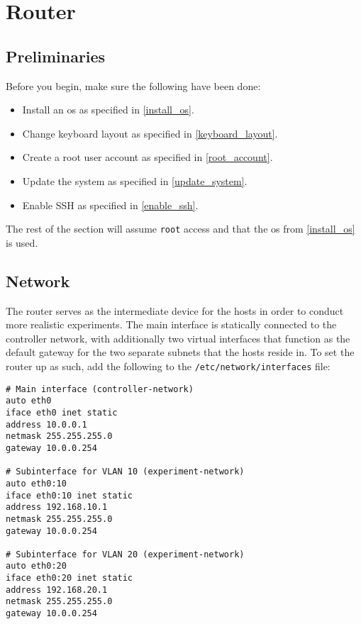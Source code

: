 \chapter{Router}


\section{Preliminaries}

Before you begin, make sure the following have been done:

\begin{itemize}
    \item Install an \gls{os} as specified in \ref{install_os}.
    \item Change keyboard layout as specified in \ref{keyboard_layout}.
    \item Create a root user account as specified in \ref{root_account}.
    \item Update the system as specified in \ref{update_system}.
    \item Enable SSH as specified in \ref{enable_ssh}.
\end{itemize}

The rest of the section will assume \lstinline{root} access and that the \gls{os} from \ref{install_os} is used.


\section{Network}

The router serves as the intermediate device for the hosts in order to conduct more realistic experiments. The main interface is statically connected to the controller network, with additionally two virtual interfaces that function as the default gateway for the two separate subnets that the hosts reside in. To set the router up as such, add the following to the \lstinline{/etc/network/interfaces} file:

\begin{lstlisting}
# Main interface (controller-network)
auto eth0
iface eth0 inet static
address 10.0.0.1
netmask 255.255.255.0
gateway 10.0.0.254

# Subinterface for VLAN 10 (experiment-network)
auto eth0:10
iface eth0:10 inet static
address 192.168.10.1
netmask 255.255.255.0
gateway 10.0.0.254

# Subinterface for VLAN 20 (experiment-network)
auto eth0:20
iface eth0:20 inet static
address 192.168.20.1
netmask 255.255.255.0
gateway 10.0.0.254
\end{lstlisting}

